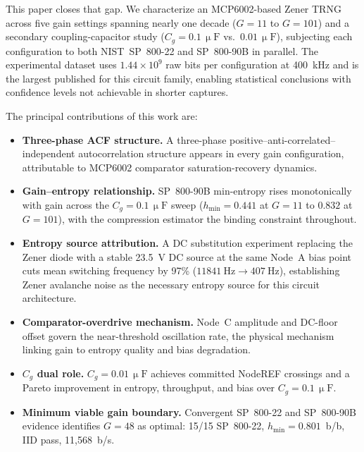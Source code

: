 \documentclass[conference]{IEEEtran}
\newcommand{\hmin}{\ensuremath{h_{\min}}}
\newcommand{\Cg}{\ensuremath{C_g}}
\begin{document}
This paper closes that gap. We characterize an MCP6002-based Zener TRNG
across five gain settings spanning nearly one decade ($G=11$ to $G=101$)
and a secondary coupling-capacitor study ($\Cg=0.1\,\upmu\mathrm{F}$
vs.\ $0.01\,\upmu\mathrm{F}$), subjecting each configuration to both
NIST~SP~800-22 and SP~800-90B in parallel. The experimental dataset uses
$1.44\!\times\!10^{9}$ raw bits per configuration at \SI{400}{\kilo\hertz} 
and is the largest published for this circuit family, enabling
statistical conclusions with confidence levels not achievable in
shorter captures.

The principal contributions of this work are:
\begin{itemize}
\item \textbf{Three-phase ACF structure.} A three-phase
positive--anti-correlated--independent autocorrelation structure
appears in every gain configuration, attributable to MCP6002
comparator saturation-recovery dynamics.

\item \textbf{Gain--entropy relationship.} SP~800-90B min-entropy
rises monotonically with gain across the $\Cg=0.1\,\upmu\mathrm{F}$
sweep ($\hmin=0.441$ at $G=11$ to $0.832$ at $G=101$), with the
compression estimator the binding constraint throughout.

\item \textbf{Entropy source attribution.} A DC substitution
experiment replacing the Zener diode with a stable
\SI{23.5}{\volt} DC source at the same Node~A bias point cuts mean
switching frequency by 97\% ($\SI{11841}{\hertz}\to\SI{407}{\hertz}$),
establishing Zener avalanche noise as the necessary entropy source
for this circuit architecture.

\item \textbf{Comparator-overdrive mechanism.} Node~C amplitude and
DC-floor offset govern the near-threshold oscillation rate, the
physical mechanism linking gain to entropy quality and bias
degradation.

\item \textbf{$\Cg$ dual role.} $\Cg=0.01\,\upmu\mathrm{F}$ achieves
committed NodeREF crossings and a Pareto improvement in entropy,
throughput, and bias over $\Cg=0.1\,\upmu\mathrm{F}$.

\item \textbf{Minimum viable gain boundary.} Convergent SP~800-22 and
SP~800-90B evidence identifies $G=48$ as optimal: 15/15 SP~800-22,
$\hmin=0.801$~b/b, IID pass, 11{,}568~b/s.
\end{itemize}
\end{document}
